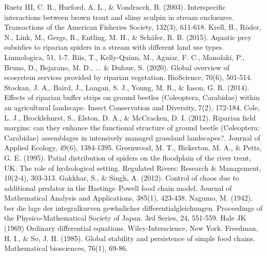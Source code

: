 \documentclass[12pt]{article}
\numberwithin{equation}{section}
\begin{document}
\begin{thebibliography}{99}
  Ruetz III, C. R., Hurford, A. L., \& Vondracek, B. (2003). Interspecific interactions between brown trout and slimy sculpin in stream enclosures. Transactions of the American Fisheries Society, 132(3), 611-618.
  Krell, B., Röder, N., Link, M., Gergs, R., Entling, M. H., \& Schäfer, R. B. (2015). Aquatic prey subsidies to riparian spiders in a stream with different land use types. Limnologica, 51, 1-7.
  Riis, T., Kelly-Quinn, M., Aguiar, F. C., Manolaki, P., Bruno, D., Bejarano, M. D., ... \& Dufour, S. (2020). Global overview of ecosystem services provided by riparian vegetation. BioScience, 70(6), 501-514.
  Stockan, J. A., Baird, J., Langan, S. J., Young, M. R., \& Iason, G. R. (2014). Effects of riparian buffer strips on ground beetles (Coleoptera, Carabidae) within an agricultural landscape. Insect Conservation and Diversity, 7(2), 172-184.
  Cole, L. J., Brocklehurst, S., Elston, D. A., \& McCracken, D. I. (2012). Riparian field margins: can they enhance the functional structure of ground beetle (Coleoptera: Carabidae) assemblages in intensively managed grassland landscapes?. Journal of Applied Ecology, 49(6), 1384-1395.
  Greenwood, M. T., Bickerton, M. A., \& Petts, G. E. (1995). Patial distribution of spiders on the floodplain of the river trent, UK: The role of hydrological setting. Regulated Rivers: Research \& Management, 10(2‐4), 303-313.
  Gakkhar, S., \& Singh, A. (2012). Control of chaos due to additional predator in the Hastings–Powell food chain model. Journal of Mathematical Analysis and Applications, 385(1), 423-438.
  Nagumo, M. (1942). ber die lage der integralkurven gewhnlicher differentialgleichungen. Proceedings of the Physico-Mathematical Society of Japan. 3rd Series, 24, 551-559.
  Hale JK (1969) Ordinary differential equations. Wiley-Interscience, New York.
  Freedman, H. I., \& So, J. H. (1985). Global stability and persistence of simple food chains. Mathematical biosciences, 76(1), 69-86.
\end{thebibliography}
\end{document}
